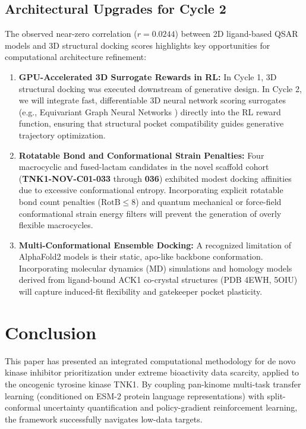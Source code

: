 \documentclass[journal]{IEEEtran}
\begin{document}
\subsection{Architectural Upgrades for Cycle 2}
The observed near-zero correlation ($r = 0.0244$) between 2D ligand-based QSAR models and 3D structural docking scores highlights key opportunities for computational architecture refinement:
\begin{enumerate}
    \item \textbf{GPU-Accelerated 3D Surrogate Rewards in RL:} In Cycle 1, 3D structural docking was executed downstream of generative design. In Cycle 2, we will integrate fast, differentiable 3D neural network scoring surrogates (e.g., Equivariant Graph Neural Networks \cite{satorras2021en}) directly into the RL reward function, ensuring that structural pocket compatibility guides generative trajectory optimization.
    \item \textbf{Rotatable Bond and Conformational Strain Penalties:} Four macrocyclic and fused-lactam candidates in the novel scaffold cohort (\textbf{TNK1-NOV-C01-033} through \textbf{036}) exhibited modest docking affinities due to excessive conformational entropy. Incorporating explicit rotatable bond count penalties ($\text{RotB} \le 8$) and quantum mechanical or force-field conformational strain energy filters will prevent the generation of overly flexible macrocycles.
    \item \textbf{Multi-Conformational Ensemble Docking:} A recognized limitation of AlphaFold2 models is their static, apo-like backbone conformation. Incorporating molecular dynamics (MD) simulations and homology models derived from ligand-bound ACK1 co-crystal structures (PDB 4EWH, 5OIU) will capture induced-fit flexibility and gatekeeper pocket plasticity.
\end{enumerate}

\section{Conclusion}
This paper has presented an integrated computational methodology for de novo kinase inhibitor prioritization under extreme bioactivity data scarcity, applied to the oncogenic tyrosine kinase TNK1. By coupling pan-kinome multi-task transfer learning (conditioned on ESM-2 protein language representations) with split-conformal uncertainty quantification and policy-gradient reinforcement learning, the framework successfully navigates low-data targets.
\end{document}
